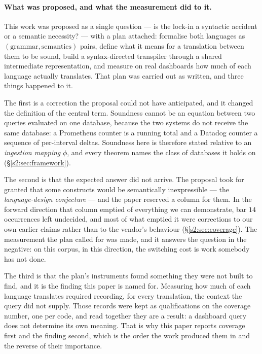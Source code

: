 \paragraph{What was proposed, and what the measurement did to it.}
This work was proposed as a single question --- is the lock-in a syntactic accident or a
semantic necessity? --- with a plan attached: formalise both languages as
$(\text{grammar},\text{semantics})$ pairs, define what it means for a translation between
them to be sound, build a syntax-directed transpiler through a shared intermediate
representation, and measure on real dashboards how much of each language actually
translates. That plan was carried out as written, and three things happened to it.

The first is a correction the proposal could not have anticipated, and it changed the
definition of the central term. Soundness cannot be an equation between two queries
evaluated on one database, because the two systems do not receive the same database: a
Prometheus counter is a running total and a Datadog counter a sequence of per-interval
deltas. Soundness here is therefore stated relative to an \emph{ingestion mapping}
$\phi$, and every theorem names the class of databases it holds on
(\S\ref{s2:sec:framework}).

The second is that the expected answer did not arrive. The proposal took for granted
that some constructs would be semantically inexpressible --- the
\emph{language-design conjecture} --- and the paper reserved a column for them. In the forward direction that column emptied of everything we can
demonstrate, bar $14$ occurrences left undecided, and most of what emptied it were
corrections to our own earlier claims rather than to the vendor's behaviour
(\S\ref{s2:sec:coverage}). The measurement the plan called for was made, and it answers
the question in the negative: on this corpus, in this direction, the switching cost is
work somebody has not done.

The third is that the plan's instruments found something they were not built to find, and
it is the finding this paper is named for. Measuring how much of each language translates
required recording, for every translation, the context the query did not supply. Those
records were kept as qualifications on the coverage number, one per code, and read
together they are a result: a dashboard query does not determine its own meaning. That is
why this paper reports coverage first and the finding second, which is the order the work
produced them in and the reverse of their importance.

